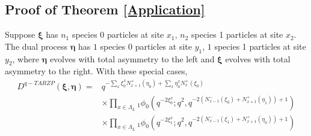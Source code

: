 \documentclass{ximera}
\begin{document}
\subsection{Proof of Theorem \ref{Application}}
Suppose $\boldsymbol\xi$ has $n_1$ species 0 particles at site $x_1$,  $n_2$ species 1 particles at site $x_2$. The dual process $\boldsymbol\eta$ has $1$ species 0 particles at site $y_1$,  $1$ species 1 particles at site $y_2$, where $\boldsymbol\eta$ evolves with total asymmetry to the left and $\boldsymbol\xi$ evolves with total asymmetry to the right. 
With these special cases,
\begin{align*}
      D^{q-TARZP} (\boldsymbol\xi,\boldsymbol\eta) = &    q^{-\sum_x\xi_0^xN_{x+1}^+(\eta_0)+\sum_x\eta_0^xN_{x}^+(\xi_0)}\\  &\times\prod_{x \in \Lambda_L }{}_1\phi_0\left(q^{-2\xi_0^x};q^2,q^{-2\left(N_{x-1}^-(\xi_0)+N_{x+1}^+(\eta_1)\right)+1}\right)\\
   & \times\prod_{x \in \Lambda_L }{}_1\phi_0\left(q^{-2\xi_1^x};q^2,q^{-2\left(N_{x-1}^-(\xi_1)+N_{x+1}^+(\eta_0)\right)+1}\right)
\end{align*}
\end{document}
